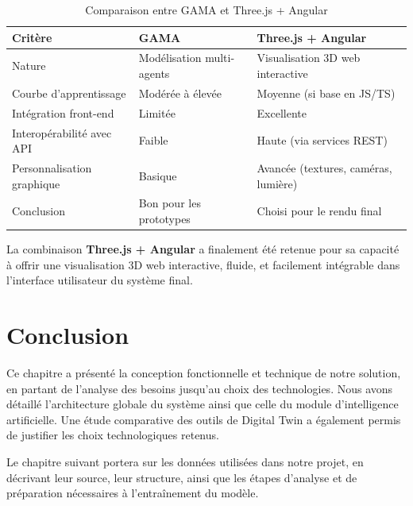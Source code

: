 \begin{table}[H]
	\centering
	\renewcommand{\arraystretch}{1.1}
	\caption{Comparaison entre GAMA et Three.js + Angular}
	\begin{tabular}{lll}
		\toprule
		\textbf{Critère} & \textbf{GAMA} & \textbf{Three.js + Angular} \\
		\midrule
		Nature & Modélisation multi-agents & Visualisation 3D web interactive \\
		Courbe d’apprentissage & Modérée à élevée & Moyenne (si base en JS/TS) \\
		Intégration front-end & Limitée & Excellente \\
		Interopérabilité avec API & Faible & Haute (via services REST) \\
		Personnalisation graphique & Basique & Avancée (textures, caméras, lumière) \\
		Conclusion & Bon pour les prototypes & Choisi pour le rendu final \\
		\bottomrule
	\end{tabular}
	\label{tab:comparaison_dt}
\end{table}

La combinaison \textbf{Three.js + Angular} a finalement été retenue pour sa capacité à offrir une visualisation 3D web interactive, fluide, et facilement intégrable dans l’interface utilisateur du système final.


\vspace{0.5cm}


\section{Conclusion}
Ce chapitre a présenté la conception fonctionnelle et technique de notre solution, en partant de l’analyse des besoins jusqu’au choix des technologies. Nous avons détaillé l’architecture globale du système ainsi que celle du module d’intelligence artificielle. Une étude comparative des outils de Digital Twin a également permis de justifier les choix technologiques retenus.

Le chapitre suivant portera sur les données utilisées dans notre projet, en décrivant leur source, leur structure, ainsi que les étapes d’analyse et de préparation nécessaires à l'entraînement du modèle.